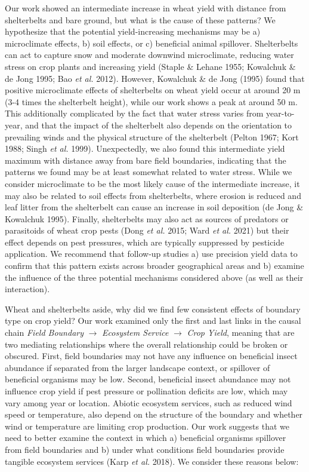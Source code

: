\documentclass[]{elsarticle} %
\begin{document}
Our work showed an intermediate increase in wheat yield with distance from shelterbelts and bare ground, but what is the cause of these patterns?
We hypothesize that the potential yield-increasing mechanisms may be a) microclimate effects, b) soil effects, or c) beneficial animal spillover.
Shelterbelts can act to capture snow and moderate downwind microclimate, reducing water stress on crop plants and increasing yield (Staple \& Lehane 1955; Kowalchuk \& de Jong 1995; Bao \emph{et al.} 2012).
However, Kowalchuk \& de Jong (1995) found that positive microclimate effects of shelterbelts on wheat yield occur at around 20 m (3-4 times the shelterbelt height), while our work shows a peak at around 50 m.
This additionally complicated by the fact that water stress varies from year-to-year, and that the impact of the shelterbelt also depends on the orientation to prevailing winds and the physical structure of the shelterbelt (Pelton 1967; Kort 1988; Singh \emph{et al.} 1999).
Unexpectedly, we also found this intermediate yield maximum with distance away from bare field boundaries, indicating that the patterns we found may be at least somewhat related to water stress.
While we consider microclimate to be the most likely cause of the intermediate increase, it may also be related to soil effects from shelterbelts, where erosion is reduced and leaf litter from the shelterbelt can cause an increase in soil deposition (de Jong \& Kowalchuk 1995).
Finally, shelterbelts may also act as sources of predators or parasitoids of wheat crop pests (Dong \emph{et al.} 2015; Ward \emph{et al.} 2021) but their effect depends on pest pressures, which are typically suppressed by pesticide application.
We recommend that follow-up studies a) use precision yield data to confirm that this pattern exists across broader geographical areas and b) examine the influence of the three potential mechanisms considered above (as well as their interaction).

Wheat and shelterbelts aside, why did we find few consistent effects of boundary type on crop yield?
Our work examined only the first and last links in the causal chain \emph{Field Boundary} \(\rightarrow\) \emph{Ecosystem Service} \(\rightarrow\) \emph{Crop Yield}, meaning that are two mediating relationships where the overall relationship could be broken or obscured.
First, field boundaries may not have any influence on beneficial insect abundance if separated from the larger landscape context, or spillover of beneficial organisms may be low.
Second, beneficial insect abundance may not influence crop yield if pest pressure or pollination deficits are low, which may vary among year or location.
Abiotic ecosystem services, such as reduced wind speed or temperature, also depend on the structure of the boundary and whether wind or temperature are limiting crop production.
Our work suggests that we need to better examine the context in which a) beneficial organisms spillover from field boundaries and b) under what conditions field boundaries provide tangible ecosystem services (Karp \emph{et al.} 2018).
We consider these reasons below:
\end{document}
